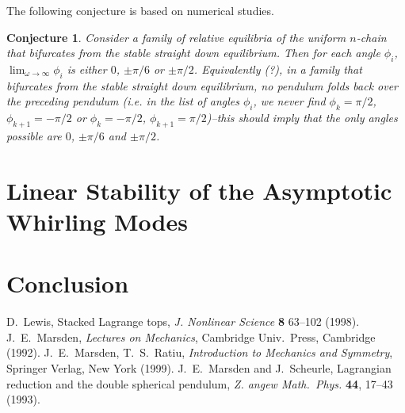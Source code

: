 \documentclass[11pt]{amsart}
\newtheorem{conj}{Conjecture}
\begin{document}
The following conjecture is based on numerical studies.
\begin{conj}
Consider a family of relative equilibria 
of the uniform $n$-chain that bifurcates from
the stable straight down equilibrium.
Then for each angle $\phi_i$,
$\lim_{\omega\rightarrow\infty} \phi_i$
is either $0$, $\pm \pi/6$ or $\pm \pi/2$.
Equivalently (?), in a family that bifurcates from
the stable straight down equilibrium,
no pendulum folds back over the preceding pendulum
(i.e. in the list of angles ${\phi_i}$, we never
find $\phi_k=\pi/2$, $\phi_{k+1}=-\pi/2$ or
$\phi_k=-\pi/2$, $\phi_{k+1}=\pi/2$)--this should
imply that the only angles possible are $0$, $\pm \pi/6$
and $\pm \pi/2$.
\end{conj}

\section{Linear Stability of the Asymptotic Whirling Modes}

\section{Conclusion}

\begin{thebibliography}{99}
 D.~Lewis,
   Stacked Lagrange tops,
   \emph{J. Nonlinear Science} \textbf{8} 63--102 (1998).
 J.~E.~Marsden, \emph{Lectures on Mechanics},
   Cambridge Univ.~Press, Cambridge (1992).
 J.~E.~Marsden, T.~S.~Ratiu,
   \emph{Introduction to Mechanics and Symmetry},
   Springer Verlag, New York (1999).
 J.~E.~Marsden and J.~Scheurle,
   Lagrangian reduction and the double spherical pendulum,
   \emph{Z. angew Math.~Phys.} \textbf{44}, 17--43 (1993).
\end{thebibliography}
\end{document}
